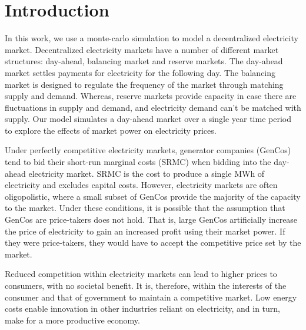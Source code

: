 




\section{Introduction}
\label{rl:sec:introduction}

In this work, we use a monte-carlo simulation to model a decentralized electricity market. Decentralized electricity markets have a number of different market structures: day-ahead, balancing market and reserve markets. The day-ahead market settles payments for electricity for the following day. The balancing market is designed to regulate the frequency of the market through matching supply and demand. Whereas, reserve markets provide capacity in case there are fluctuations in supply and demand, and electricity demand can't be matched with supply. Our model simulates a day-ahead market over a single year time period to explore the effects of market power on electricity prices.

Under perfectly competitive electricity markets, generator companies (GenCos) tend to bid their short-run marginal costs (SRMC) when bidding into the day-ahead electricity market. SRMC is the cost to produce a single MWh of electricity and excludes capital costs. However, electricity markets are often oligopolistic, where a small subset of GenCos provide the majority of the capacity to the market. Under these conditions, it is possible that the assumption that GenCos are price-takers does not hold. That is, large GenCos artificially increase the price of electricity to gain an increased profit using their market power. If they were price-takers, they would have to accept the competitive price set by the market.

Reduced competition within electricity markets can lead to higher prices to consumers, with no societal benefit. It is, therefore, within the interests of the consumer and that of government to maintain a competitive market. Low energy costs enable innovation in other industries reliant on electricity, and in turn, make for a more productive economy. %

